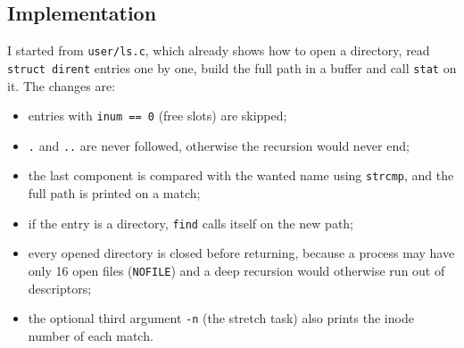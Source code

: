 \documentclass[12pt,a4paper]{article}
\begin{document}
\subsection{Implementation}

I started from \texttt{user/ls.c}, which already shows how to open a directory, read \texttt{struct dirent} entries one by one, build the full path in a buffer and call \texttt{stat} on it. The changes are:
\begin{itemize}
  \item entries with \texttt{inum == 0} (free slots) are skipped;
  \item \texttt{.} and \texttt{..} are never followed, otherwise the recursion would never end;
  \item the last component is compared with the wanted name using \texttt{strcmp}, and the full path is printed on a match;
  \item if the entry is a directory, \texttt{find} calls itself on the new path;
  \item every opened directory is closed before returning, because a process may have only 16 open files (\texttt{NOFILE}) and a deep recursion would otherwise run out of descriptors;
  \item the optional third argument \texttt{-n} (the stretch task) also prints the inode number of each match.
\end{itemize}
\end{document}
